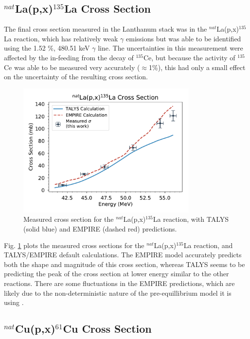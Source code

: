 \documentclass[aps,twocolumn,secnumarabic,balancelastpage,amsmath,amssymb,nofootinbib,floatfix]{revtex4-1}
\begin{document}
\subsection{$^{nat}$La(p,x)$^{135}$La Cross Section}

The final cross section measured in the Lanthanum stack was in the $^{nat}$La(p,x)$^{135}$La reaction, which has relatively weak $\gamma$ emissions but was able to be identified using the 1.52 \%, 480.51 keV $\gamma$ line.  The uncertainties in this measurement were affected by the in-feeding from the decay of $^{135}$Ce, but because the activity of $^{135}$Ce was able to be measured very accurately ($\approx$1\%), this had only a small effect on the uncertainty of the resulting cross section.

\begin{figure}[htb]
\includegraphics[width=9cm]{cross_sections/135LA}
\caption{Measured cross section for the $^{nat}$La(p,x)$^{135}$La reaction, with TALYS (solid blue) and EMPIRE (dashed red) predictions.
}
\label{fig:135LA}
\end{figure}

Fig. \ref{fig:135LA} plots the measured cross sections for the $^{nat}$La(p,x)$^{135}$La reaction, and TALYS/EMPIRE default calculations.  The EMPIRE model accurately predicts both the shape and magnitude of this cross section, whereas TALYS seems to be predicting the peak of the cross section at lower energy similar to the other reactions.  There are some fluctuations in the EMPIRE predictions, which are likely due to the non-deterministic nature of the pre-equillibrium model it is using \cite{HERMAN20072655}.

\subsection{$^{nat}$Cu(p,x)$^{61}$Cu Cross Section}
\end{document}

